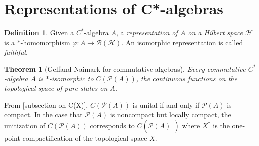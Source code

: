 \documentclass[12pt,a4paper]{amsart}
\theoremstyle{plain}
\newtheorem{thm}{Theorem}
\theoremstyle{definition}
\newtheorem{defn}{Definition}
\renewcommand{\H}{\mathcal{H}}
\newcommand{\B}{\mathcal{B}}
\newcommand{\1}{\mathbbm{1}}
\renewcommand{\phi}{\varphi}
\newcommand{\CX}{C(X)}
\renewcommand{\P}[1]{\mathscr{P}(#1)}
\begin{document}


\section{Representations of C*-algebras}

\begin{defn}
	Given a $C^\ast$-algebra $A$, a \emph{representation of $A$ on a Hilbert space $\H$} 
	is a $\ast$-homomorphism $\phi: A \to \B(\H)$. 
	An isomorphic representation is called \emph{faithful}.
\end{defn}
	
\begin{thm}[Gelfand-Naimark for commutative algebras] %
	Every commutative $C^\ast$-algebra $A$ is $\ast$-isomorphic to $C(\P{A})$,
	 the continuous functions on the topological space of pure states on $A$.
\end{thm}	


From [subsection on \CX], $C(\P{A})$ is unital if and only if $\P{A}$ is compact. In the case that 
$\P{A}$ is noncompact but locally compact, the unitization of $C(\P{A})$ corresponds to $C(\P{A}^\dagger)$ where $X^\dagger$ is the one-point compactification of the topological space $X$.
	
\end{document}
